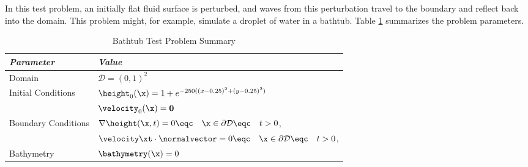 In this test problem, an initially flat fluid surface is perturbed, and waves
from this perturbation travel to the boundary and reflect back into the
domain. This problem might, for example, simulate a droplet of water in
a bathtub.
Table \ref{tab:bathtub} summarizes the problem parameters.

\begin{table}[htb]\caption{Bathtub Test Problem Summary}
\label{tab:bathtub}
\centering
\begin{tabular}{l l}\toprule
\emph{Parameter} & \emph{Value}\\\midrule
Domain & $\mathcal{D} = (0,1)^2$\\
Initial Conditions & $\height_0(\x)=1 + e^{-250((x-0.25)^2+(y-0.25)^2)}$\\
                   & $\velocity_0(\x) = \mathbf{0}$\\
Boundary Conditions & $\nabla\height(\x,t)=0
  \eqc \quad \x\in\partial\mathcal{D}\eqc \quad t>0$,\\
                    & $\velocity\xt\cdot\normalvector = 0
  \eqc \quad \x\in\partial\mathcal{D}\eqc \quad t>0$,\\
Bathymetry & $\bathymetry(\x)=0$\\
\bottomrule\end{tabular}
\end{table}

